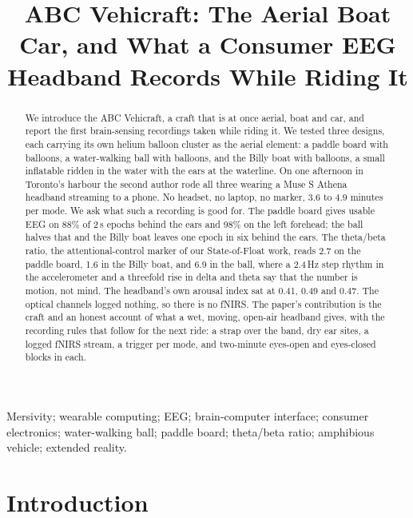 \documentclass[conference]{IEEEtran}
\begin{document}
\title{ABC Vehicraft: The Aerial Boat Car, and What a Consumer EEG Headband Records While Riding It}

\author{
}

\maketitle

\begin{abstract}
We introduce the ABC Vehicraft, a craft that is at once aerial, boat and car, and report the first brain-sensing recordings taken while riding it. We tested three designs, each carrying its own helium balloon cluster as the aerial element: a paddle board with balloons, a water-walking ball with balloons, and the Billy boat with balloons, a small inflatable ridden in the water with the ears at the waterline. On one afternoon in Toronto's harbour the second author rode all three wearing a Muse S Athena headband streaming to a phone. No headset, no laptop, no marker, 3.6 to 4.9 minutes per mode. We ask what such a recording is good for. The paddle board gives usable EEG on 88\% of 2\,s epochs behind the ears and 98\% on the left forehead; the ball halves that and the Billy boat leaves one epoch in six behind the ears. The theta/beta ratio, the attentional-control marker of our State-of-Float work, reads 2.7 on the paddle board, 1.6 in the Billy boat, and 6.9 in the ball, where a 2.4\,Hz step rhythm in the accelerometer and a threefold rise in delta and theta say that the number is motion, not mind. The headband's own arousal index sat at 0.41, 0.49 and 0.47. The optical channels logged nothing, so there is no fNIRS. The paper's contribution is the craft and an honest account of what a wet, moving, open-air headband gives, with the recording rules that follow for the next ride: a strap over the band, dry ear sites, a logged fNIRS stream, a trigger per mode, and two-minute eyes-open and eyes-closed blocks in each.
\end{abstract}

\begin{IEEEkeywords}
Mersivity; wearable computing; EEG; brain-computer interface; consumer electronics; water-walking ball; paddle board; theta/beta ratio; amphibious vehicle; extended reality.
\end{IEEEkeywords}

\section{Introduction}
\end{document}
